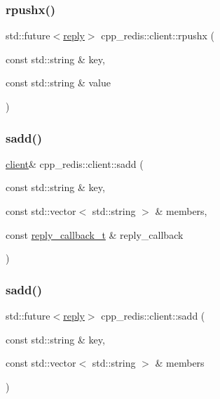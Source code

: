 \mbox{\label{classcpp__redis_1_1client_a83d512f8f44f896383d050920634489f}} 
\subsubsection{\texorpdfstring{rpushx()}{rpushx()}\hspace{0.1cm}{\footnotesize\ttfamily [2/2]}}
{\footnotesize\ttfamily std\+::future$<$\hyperlink{classcpp__redis_1_1reply}{reply}$>$ cpp\+\_\+redis\+::client\+::rpushx (\begin{DoxyParamCaption}\item[{const std\+::string \&}]{key,  }\item[{const std\+::string \&}]{value }\end{DoxyParamCaption})}

\mbox{\label{classcpp__redis_1_1client_acf725ad7bc758599617ff166280f9622}} 
\subsubsection{\texorpdfstring{sadd()}{sadd()}\hspace{0.1cm}{\footnotesize\ttfamily [1/2]}}
{\footnotesize\ttfamily \hyperlink{classcpp__redis_1_1client}{client}\& cpp\+\_\+redis\+::client\+::sadd (\begin{DoxyParamCaption}\item[{const std\+::string \&}]{key,  }\item[{const std\+::vector$<$ std\+::string $>$ \&}]{members,  }\item[{const \hyperlink{classcpp__redis_1_1client_a061a1140d36d2eaeda82b09a0bb3f9f2}{reply\+\_\+callback\+\_\+t} \&}]{reply\+\_\+callback }\end{DoxyParamCaption})}

\mbox{\label{classcpp__redis_1_1client_a1a611fd2c5847d37973fed5d24f25fa1}} 
\subsubsection{\texorpdfstring{sadd()}{sadd()}\hspace{0.1cm}{\footnotesize\ttfamily [2/2]}}
{\footnotesize\ttfamily std\+::future$<$\hyperlink{classcpp__redis_1_1reply}{reply}$>$ cpp\+\_\+redis\+::client\+::sadd (\begin{DoxyParamCaption}\item[{const std\+::string \&}]{key,  }\item[{const std\+::vector$<$ std\+::string $>$ \&}]{members }\end{DoxyParamCaption})}

